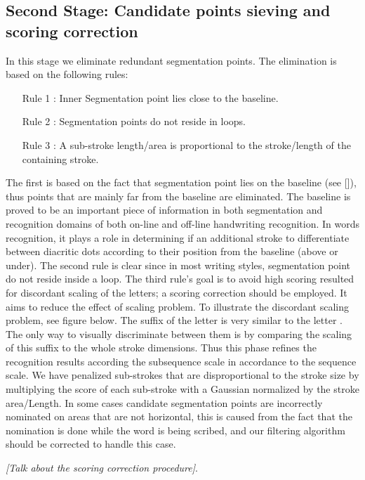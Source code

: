 \documentclass[journal,compsoc]{IEEEtran}
\begin{document}
\subsection{Second  Stage: Candidate points sieving and scoring correction}
In this stage we eliminate redundant segmentation points. The elimination is based on the following rules:

\begin{itemize}
\item [Rule 1]: Inner Segmentation point lies close to the baseline. 
\item [Rule 2]: Segmentation points do not reside in loops.
\item [Rule 3]: A sub-stroke length/area is proportional to the stroke/length of the containing stroke.
\end{itemize}

The first is based on the fact that segmentation point lies on the baseline (see []), thus points that are mainly far from the baseline are eliminated. The baseline is proved to be an important piece of information in both segmentation and recognition domains of both on-line and off-line handwriting recognition. In words recognition, it plays a role in determining if an additional stroke to differentiate between diacritic dots according to their position from the baseline (above or under).
The second rule is clear since in most writing styles, segmentation point do not reside inside a loop.
The third rule's goal is to avoid high scoring resulted for discordant scaling of the letters; a scoring correction should be employed. It aims to reduce the effect of scaling problem. To illustrate the discordant scaling problem, see figure below. The suffix of the letter  is very similar to the letter . The only way to visually discriminate between them is by comparing the scaling of this suffix to the whole stroke dimensions. Thus this phase refines the recognition results according the subsequence scale in accordance to the sequence scale. We have penalized sub-strokes that are disproportional to the stroke size by multiplying the score of each sub-stroke with a Gaussian normalized by the stroke area/Length.
In some cases candidate segmentation points are incorrectly nominated on areas that are not horizontal, this is caused from the fact that the nomination is done while the word is being scribed, and our filtering algorithm should be corrected to handle this case.

\emph{[Talk about the scoring correction procedure]}.
\end{document}
